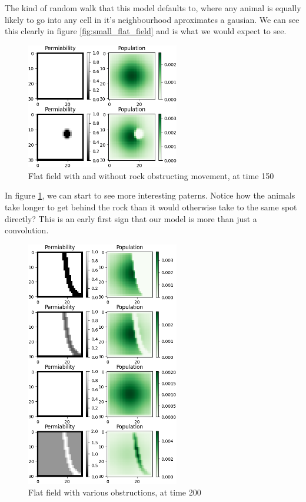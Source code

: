 \documentclass[twocolumn]{article}
\begin{document}
The kind of random walk that this model defaults to, where any animal is equally likely to go into any cell in it's neighbourhood aproximates a gausian. We can see this clearly in figure \ref{fig:small_flat_field} and is what we would expect to see. 

\begin{figure}[h!]
	\begin{center}
		\includegraphics[width=18em]{flat_field_with_or_without_rock.png}
		\caption{Flat field with and without rock obstructing movement, at time 150}
		\label{fig:flat_field_with_or_without_rock}
	\end{center}
\end{figure}

In figure \ref{fig:flat_field_with_or_without_rock}, we can start to see more interesting paterns. Notice how the animals take longer to get behind the rock than it would otherwise take to the same spot directly? This is an early first sign that our model is more than just a convolution.

\begin{figure}[h!]
	\begin{center}
		\includegraphics[width=18em]{river_and_friends.png}
		\caption{Flat field with various obstructions, at time 200}
		\label{fig:river_and_friends}
	\end{center}
\end{figure}
\end{document}
